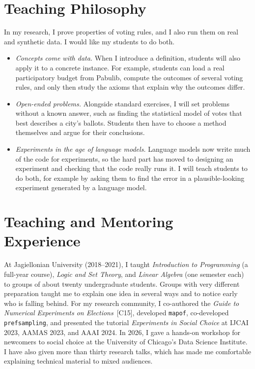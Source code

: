 \documentclass[11pt,a4paper]{article}
\newcommand{\pub}[1]{~[#1]}
\begin{document}
\headercontactfalse
{}

\section{Teaching Philosophy}

In my research, I prove properties of voting rules, and I also run them on
real and synthetic data. I would like my students to do both.
\begin{itemize}
  \item \emph{Concepts come with data.} When I introduce a definition, students will
also apply it to a concrete instance. For example, students can load a real participatory
  budget from Pabulib, compute the outcomes of several voting rules, and only
  then study the axioms that explain why the outcomes differ.
  \item \emph{Open-ended problems.} Alongside standard exercises, I will set
problems without a known answer, such as finding the statistical model of
votes that best describes a city's ballots. Students then have to choose a
method themselves and argue for their conclusions.
  \item \emph{Experiments in the age of language models.} Language models now
write much of the code for experiments, so the hard part has moved to
designing an experiment and checking that the code really runs it. I will
teach students to do both, for example by asking them to find the error in a
plausible-looking experiment generated by a language model.
\end{itemize}
\section{Teaching and Mentoring Experience}

At Jagiellonian University (2018--2021), I taught \emph{Introduction to
Programming} (a full-year course), \emph{Logic and Set Theory}, and
\emph{Linear Algebra} (one semester each) to groups of about twenty
undergraduate students. Groups with very different preparation taught me to
explain one idea in several ways and to notice early who is falling behind.
For my research community, I co-authored the \emph{Guide to Numerical
Experiments on Elections}\pub{C15}, developed \texttt{mapof}, co-developed
\texttt{prefsampling}, and presented the tutorial \emph{Experiments in Social
Choice} at IJCAI 2023, AAMAS 2023, and AAAI 2024. In 2026, I gave a hands-on
workshop for newcomers to social choice at the University of Chicago's Data
Science Institute.
I have also given more than thirty research talks, which has made me
comfortable explaining technical material to mixed audiences.
\end{document}
